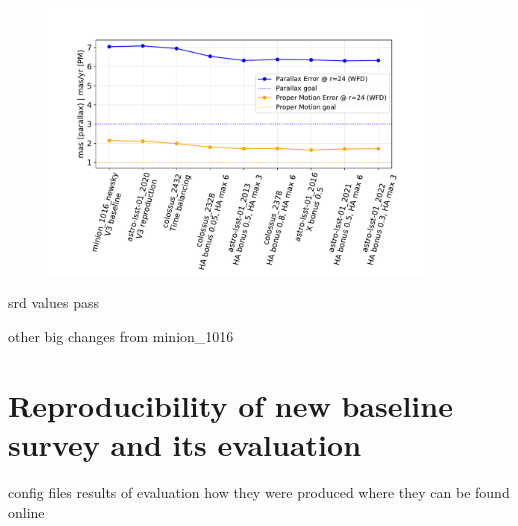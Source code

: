 \documentclass[DM,lsstdraft,authoryear,toc]{lsstdoc}
\begin{document}
\begin{figure}[ht]
\centering
\includegraphics[width=0.9\textwidth]{figures/astrometry}
\caption{
\label{fig:astrometry}}
\end{figure}




srd values pass

other big changes from minion\_1016

\section{Reproducibility of new baseline survey and its evaluation}

config files
results of evaluation
how they were produced
where they can be found online


\end{document}
